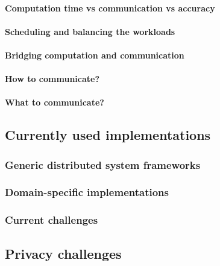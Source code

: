 \paragraph{Computation time vs communication vs accuracy}
\paragraph{Scheduling and balancing the workloads}
\paragraph{Bridging computation and communication}
\paragraph{How to communicate?}
\paragraph{What to communicate?}










\subsection{Currently used implementations}
\subsubsection{Generic distributed system frameworks}
\subsubsection{Domain-specific implementations}
\subsubsection{Current challenges}










\subsection{Privacy challenges}
